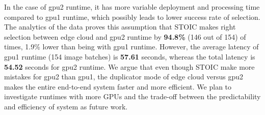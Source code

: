 In the case of gpu2 runtime, it has more variable deployment and processing time compared to gpu1 runtime, which possibly leads to lower success rate of selection. The analytics of the data proves this assumption that STOIC makes right selection between edge cloud and gpu2 runtime by \textbf{94.8\%} (146 out of 154) of times, 1.9\% lower than being with gpu1 runtime. However, the average latency of gpu1 runtime (154 image batches) is \textbf{57.61} seconds, whereas the total latency is \textbf{54.52} seconds for gpu2 runtime. We argue that even though STOIC make more mistakes for gpu2 than gpu1, the duplicator mode of edge cloud versus gpu2 makes the entire end-to-end system faster and more efficient. We plan to investigate runtimes with more GPUs and the trade-off between the predictability and efficiency of system as future work.
